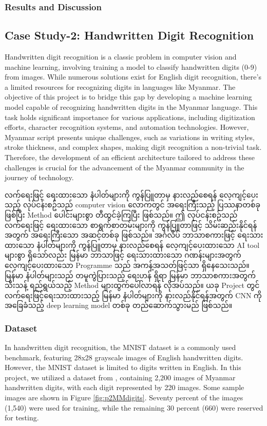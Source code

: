 \subsubsection{Results and Discussion}

\newpage
\subsection{Case Study-2: Handwritten Digit Recognition}
Handwritten digit recognition is a classic problem in computer vision and machine learning, involving training a model to classify handwritten digits (0-9) from images. While numerous solutions exist for English digit recognition, there's a limited resources for recognizing digits in languages like Myanmar. The objective of this project is to bridge this gap by developing a machine learning model capable of recognizing handwritten digits in the Myanmar language. This task holds significant importance for various applications, including digitization efforts, character recognition systems, and automation technologies. However, Myanmar script presents unique challenges, such as variations in writing styles, stroke thickness, and complex shapes, making digit recognition a non-trivial task. Therefore, the development of an efficient architecture tailored to address these challenges is crucial for the advancement of the Myanmar community in the journey of technology.

လက်ရေးဖြင့် ရေးထားသော နံပါတ်များကို ကွန်ပြူတာမှ နားလည်စေရန် လေ့ကျင့်ပေးသည့် လုပ်ငန်းစဥ်သည် computer vision လောကတွင် အရေးကြီးသည့် ပြဿနာတစ်ခုဖြစ်ပြီး Method ပေါင်းများစွာ တီထွင်ခဲ့ကြပြီး ဖြစ်သည်။ ဤ လုပ်ငန်းစဥ်သည် လက်ရေးဖြင့် ရေးထားသော စာရွက်စာတမ်းများကို ကွန်ပြူတာဖြင့် သိမ်းဆည်းနိုင်ရန် အတွက် အရေးကြီးသော အဆင့်တစ်ခု ဖြစ်သည်။ အင်္ဂလိပ် ဘာသာစကားဖြင့် ရေးသားထားသော နံပါတ်များကို ကွန်ပြူတာမှ နားလည်စေရန် လေ့ကျင့်ပေးထားသော AI tool များစွာ ရှိသော်လည်း မြန်မာ ဘာသာဖြင့် ရေးသားထားသော ဂဏန်းများအတွက် လေ့ကျင့်ပေးထားသော Programme သည် အကန့်အသတ်ဖြင့်သာ ရှိနေသေးသည်။ မြန်မာ နံပါတ်များသည် တမူကွဲပြားသည့် ရေးဟန် ရှိရာ မြန်မာ ဘာသာစကားအတွက် သီးသန့် ရည်ရွယ်သည့် Method များထွက်ပေါ်လာရန် လိုအပ်သည်။ ယခု Project တွင် လက်ရေးဖြင့်ရေးသားထားသည့် မြန်မာ နံပါတ်များကို နားလည်နိုင်ရန်အတွက် CNN ကို အခြေခံသည့် deep learning model တစ်ခု တည်ဆောက်သွားမည် ဖြစ်သည်။ 

\subsubsection{Dataset}
In handwritten digit recognition, the MNIST dataset \cite{web:mnist} is a commonly used benchmark, featuring 28x28 grayscale images of English handwritten digits. However, the MNIST dataset is limited to digits written in English. In this project, we utilized a dataset from \cite{web:MMdataset}, containing 2,200 images of Myanmar handwritten digits, with each digit represented by 220 images. Some sample images are shown in Figure \ref{fig:p2MMdigits}. Seventy percent of the images (1,540) were used for training, while the remaining 30 percent (660) were reserved for testing.

